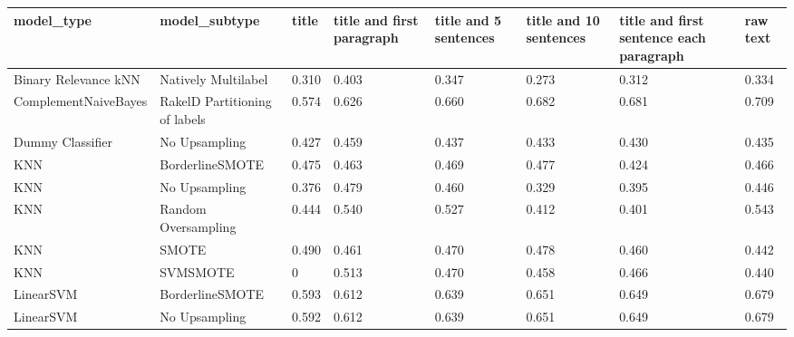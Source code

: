 \begin{tabular}{llllllll}
\toprule
                     model\_type &                 model\_subtype & title & title and first paragraph & title and 5 sentences & title and 10 sentences & title and first sentence each paragraph &  raw text \\
\midrule
           Binary Relevance kNN &           Natively Multilabel & 0.310 &                     0.403 &                 0.347 &                  0.273 &                                   0.312 &     0.334 \\
           ComplementNaiveBayes & RakelD Partitioning of labels & 0.574 &                     0.626 &                 0.660 &                  0.682 &                                   0.681 &     0.709 \\
               Dummy Classifier &                 No Upsampling & 0.427 &                     0.459 &                 0.437 &                  0.433 &                                   0.430 &     0.435 \\
                            KNN &               BorderlineSMOTE & 0.475 &                     0.463 &                 0.469 &                  0.477 &                                   0.424 &     0.466 \\
                            KNN &                 No Upsampling & 0.376 &                     0.479 &                 0.460 &                  0.329 &                                   0.395 &     0.446 \\
                            KNN &           Random Oversampling & 0.444 &                     0.540 &                 0.527 &                  0.412 &                                   0.401 &     0.543 \\
                            KNN &                         SMOTE & 0.490 &                     0.461 &                 0.470 &                  0.478 &                                   0.460 &     0.442 \\
                            KNN &                      SVMSMOTE &     0 &                     0.513 &                 0.470 &                  0.458 &                                   0.466 &     0.440 \\
                      LinearSVM &               BorderlineSMOTE & 0.593 &                     0.612 &                 0.639 &                  0.651 &                                   0.649 &     0.679 \\
                      LinearSVM &                 No Upsampling & 0.592 &                     0.612 &                 0.639 &                  0.651 &                                   0.649 &     0.679 \\

\end{tabular}
